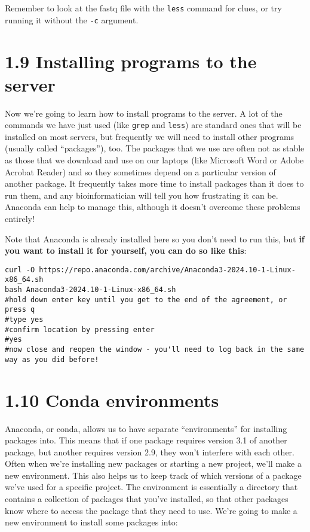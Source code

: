 \documentclass[
]{book}
\begin{document}
Remember to look at the fastq file with the \texttt{less} command for clues, or try running it without the \texttt{-c} argument.

\section{1.9 Installing programs to the server}\label{installing-programs-to-the-server}

Now we're going to learn how to install programs to the server. A lot of the commands we have just used (like \texttt{grep} and \texttt{less}) are standard ones that will be installed on most servers, but frequently we will need to install other programs (usually called ``packages''), too. The packages that we use are often not as stable as those that we download and use on our laptops (like Microsoft Word or Adobe Acrobat Reader) and so they sometimes depend on a particular version of another package. It frequently takes more time to install packages than it does to run them, and any bioinformatician will tell you how frustrating it can be. Anaconda can help to manage this, although it doesn't overcome these problems entirely!

Note that Anaconda is already installed here so you don't need to run this, but \textbf{if you want to install it for yourself, you can do so like this}:

\begin{verbatim}
curl -O https://repo.anaconda.com/archive/Anaconda3-2024.10-1-Linux-x86_64.sh
bash Anaconda3-2024.10-1-Linux-x86_64.sh
#hold down enter key until you get to the end of the agreement, or press q
#type yes
#confirm location by pressing enter
#yes
#now close and reopen the window - you'll need to log back in the same way as you did before!
\end{verbatim}

\section{1.10 Conda environments}\label{conda-environments}

Anaconda, or conda, allows us to have separate ``environments'' for installing packages into. This means that if one package requires version 3.1 of another package, but another requires version 2.9, they won't interfere with each other. Often when we're installing new packages or starting a new project, we'll make a new environment. This also helps us to keep track of which versions of a package we've used for a specific project. The environment is essentially a directory that contains a collection of packages that you've installed, so that other packages know where to access the package that they need to use. We're going to make a new environment to install some packages into:
\end{document}
